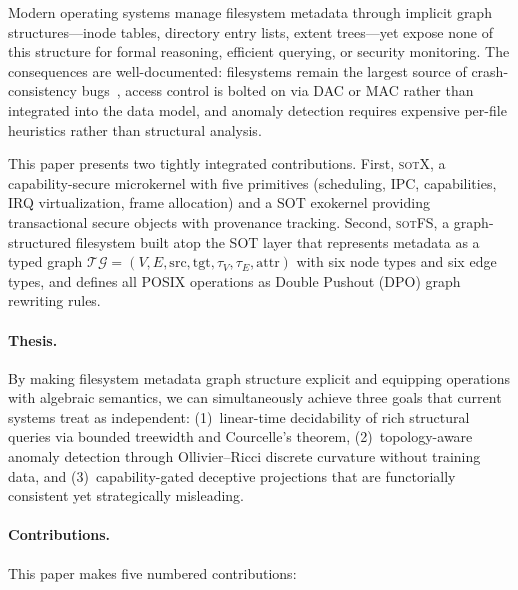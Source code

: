 \documentclass[11pt,a4paper]{article}
\theoremstyle{definition}
\theoremstyle{remark}
\newcommand{\TG}{\ensuremath{\mathcal{TG}}}
\newcommand{\sotfs}{\textsc{sotFS}}
\newcommand{\sotx}{\textsc{sotX}}
\begin{document}
Modern operating systems manage filesystem metadata through implicit
graph structures---inode tables, directory entry lists, extent
trees---yet expose none of this structure for formal reasoning,
efficient querying, or security monitoring. The consequences are
well-documented: filesystems remain the largest source of
crash-consistency bugs~\cite{pillai2014}, access control is bolted on
via DAC or MAC rather than integrated into the data model, and anomaly
detection requires expensive per-file heuristics rather than
structural analysis.

This paper presents two tightly integrated contributions. First,
\sotx{}, a capability-secure microkernel with five primitives
(scheduling, IPC, capabilities, IRQ virtualization, frame allocation)
and a SOT exokernel providing transactional secure objects with
provenance tracking. Second, \sotfs{}, a graph-structured filesystem
built atop the SOT layer that represents metadata as a typed graph
$\TG = (V, E, \mathrm{src}, \mathrm{tgt}, \tau_V, \tau_E,
\mathrm{attr})$ with six node types and six edge types, and defines
all POSIX operations as Double Pushout (DPO) graph rewriting rules.

\paragraph{Thesis.}
By making filesystem metadata graph structure explicit and equipping
operations with algebraic semantics, we can simultaneously achieve
three goals that current systems treat as independent:
(1)~linear-time decidability of rich structural queries via bounded
treewidth and Courcelle's theorem,
(2)~topology-aware anomaly detection through Ollivier--Ricci discrete
curvature without training data, and
(3)~capability-gated deceptive projections that are functorially
consistent yet strategically misleading.

\paragraph{Contributions.}
This paper makes five numbered contributions:
\end{document}
